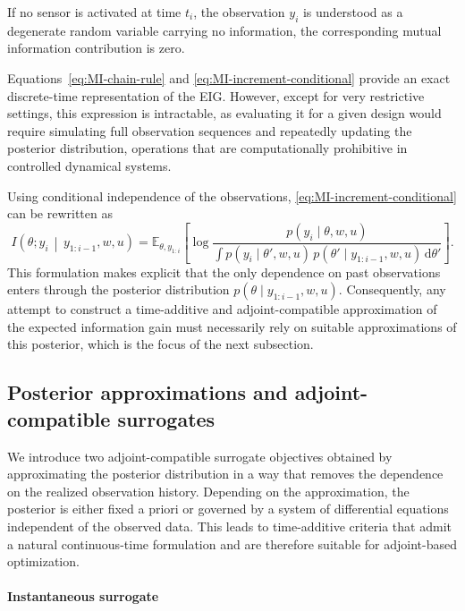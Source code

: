 \documentclass[a4paper,11pt]{article}
\newcommand{\E}{\mathbb{E}}
\begin{document}
If no sensor is activated at time $t_i$, the observation $y_i$ is understood as a degenerate random variable carrying no information, the corresponding mutual information contribution is zero.


Equations~\eqref{eq:MI-chain-rule} and \eqref{eq:MI-increment-conditional} provide an exact
discrete-time representation of the EIG. However, except for very restrictive settings,
this expression is intractable, as evaluating it for a given design would require simulating full observation sequences and repeatedly updating the posterior distribution, operations that are computationally prohibitive in controlled dynamical systems.


Using conditional independence of the observations, \eqref{eq:MI-increment-conditional}
can be rewritten as
\begin{equation}
  I\!\left(\theta; y_i \,\middle|\, y_{1:i-1},w,u\right)
  =
  \E_{\theta, y_{1:i}}\!\left[
    \log
    \frac{
      p\!\left(y_i \mid \theta,w,u\right)
    }{
      \int p\!\left(y_i \mid \theta',w,u\right)\,
           p(\theta' \mid y_{1:i-1},w,u)\,\mathrm{d}\theta'
    }
  \right].
  \label{eq:MI-increment-Gaussian-rewrite}
\end{equation}
This formulation makes explicit that the only dependence on past observations enters through
the posterior distribution $p(\theta \mid y_{1:i-1},w,u)$. Consequently, any attempt to
construct a time-additive and adjoint-compatible approximation of the expected information
gain must necessarily rely on suitable approximations of this posterior, which is the focus
of the next subsection.

\subsection{Posterior approximations and adjoint-compatible surrogates}

We introduce two adjoint-compatible surrogate objectives obtained by approximating the posterior distribution in a way that removes the dependence on the realized observation history. Depending on the approximation, the posterior is either fixed a priori or governed by a system of differential equations independent of the observed data. This leads to time-additive criteria that admit a natural continuous-time formulation and are therefore suitable for adjoint-based optimization.

\paragraph{Instantaneous surrogate}
\label{subsec:approx_instant_gain}
\end{document}
